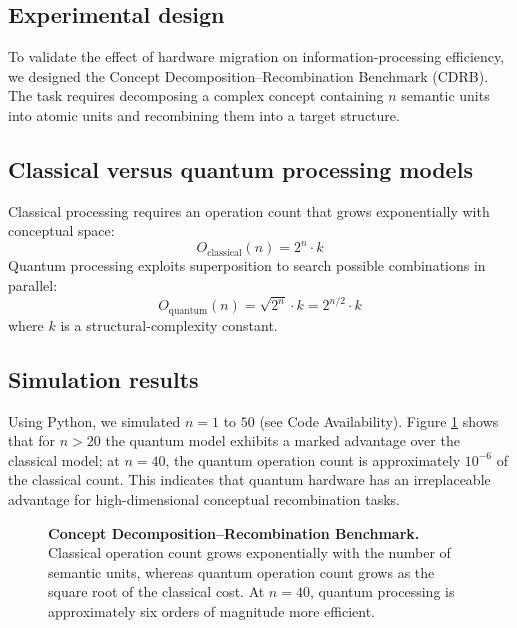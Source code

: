 \documentclass[11pt,a4paper]{article}
\begin{document}
\subsection{Experimental design}

To validate the effect of hardware migration on information-processing efficiency, we designed the Concept Decomposition--Recombination Benchmark (CDRB). The task requires decomposing a complex concept containing $n$ semantic units into atomic units and recombining them into a target structure.

\subsection{Classical versus quantum processing models}

Classical processing requires an operation count that grows exponentially with conceptual space:
\begin{equation}
O_{\text{classical}}(n) = 2^n \cdot k
\end{equation}
Quantum processing exploits superposition to search possible combinations in parallel:
\begin{equation}
O_{\text{quantum}}(n) = \sqrt{2^n} \cdot k = 2^{n/2} \cdot k
\end{equation}
where $k$ is a structural-complexity constant.

\subsection{Simulation results}

Using Python, we simulated $n = 1$ to $50$ (see Code Availability). Figure \ref{fig:benchmark} shows that for $n > 20$ the quantum model exhibits a marked advantage over the classical model; at $n = 40$, the quantum operation count is approximately $10^{-6}$ of the classical count. This indicates that quantum hardware has an irreplaceable advantage for high-dimensional conceptual recombination tasks.

\begin{figure}[htbp]
\centering
{}
\caption{\textbf{Concept Decomposition--Recombination Benchmark.} Classical operation count grows exponentially with the number of semantic units, whereas quantum operation count grows as the square root of the classical cost. At $n=40$, quantum processing is approximately six orders of magnitude more efficient.}
\label{fig:benchmark}
\end{figure}
\end{document}
